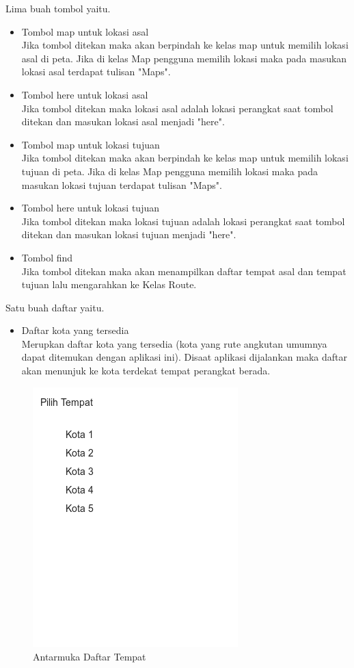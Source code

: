 Lima buah tombol yaitu. 
\begin{itemize}
	\item Tombol map untuk lokasi asal\\
	Jika tombol ditekan maka akan berpindah ke kelas map untuk memilih lokasi asal di peta. Jika di kelas Map pengguna memilih lokasi maka pada masukan lokasi asal terdapat tulisan "Maps".
	\item Tombol here untuk lokasi asal\\
	Jika tombol ditekan maka lokasi asal adalah lokasi perangkat saat tombol ditekan dan masukan lokasi asal menjadi "here".
	\item Tombol map untuk lokasi tujuan\\
	Jika tombol ditekan maka akan berpindah ke kelas map untuk memilih lokasi tujuan di peta. Jika di kelas Map pengguna memilih lokasi maka pada masukan lokasi tujuan terdapat tulisan "Maps".
	\item Tombol here untuk lokasi tujuan\\
	Jika tombol ditekan maka lokasi tujuan adalah lokasi perangkat saat tombol ditekan dan masukan lokasi tujuan menjadi "here".
	\item Tombol find\\
	Jika tombol ditekan maka akan menampilkan daftar tempat asal dan tempat tujuan lalu mengarahkan ke Kelas Route.
\end{itemize}

Satu buah daftar yaitu.
\begin{itemize}
	\item Daftar kota yang tersedia\\
	Merupkan daftar kota yang tersedia (kota yang rute angkutan umumnya dapat ditemukan dengan aplikasi ini). Disaat aplikasi dijalankan maka daftar akan menunjuk ke kota terdekat tempat perangkat berada.
\end{itemize}

\begin{figure}[h]
	\centering
		\includegraphics[scale=0.6]{Gambar/perancangan_antarmuka/ListTempat}
	\caption{Antarmuka Daftar Tempat}
	\label{fig:Antarmuka Daftar Tempat}
\end{figure}

